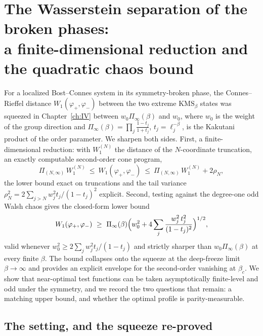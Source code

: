 \chapter[The Wasserstein separation of the broken phases]{The Wasserstein separation of the broken phases:\\ a finite-dimensional reduction and the quadratic chaos bound}\label{ch:XXIX}
\renewcommand{\Prob}{\mathrm{Prob}}
\begin{summary}
For a localized Bost--Connes system in its symmetry-broken phase, the Connes--Rieffel
distance $W_1(\varphi_+,\varphi_-)$ between the two extreme $\mathrm{KMS}_\beta$ states was
squeezed in Chapter~\ref{ch:IV} between $w_0\Pi_\infty(\beta)$ and $w_0$, where $w_0$ is
the weight of the group direction and $\Pi_\infty(\beta)=\prod_j\frac{1-t_j}{1+t_j}$,
$t_j=\ell_j^{-\beta}$, is the Kakutani product of the order parameter. We sharpen both
sides. First, a finite-dimensional reduction: with $W_1^{(N)}$ the distance of the
$N$-coordinate truncation, an exactly computable second-order cone program,
\[
\Pi_{(N,\infty)}\,W_1^{(N)}\ \le\ W_1(\varphi_+,\varphi_-)\ \le\
\Pi_{(N,\infty)}\,W_1^{(N)}+2\rho_N,
\]
the lower bound exact on truncations and the tail variance
$\rho_N^2=2\sum_{j>N}w_j^2t_j/(1-t_j)^2$ explicit. Second,
testing against the degree-one odd Walsh chaos gives the closed-form lower bound
\[
W_1(\varphi_+,\varphi_-)\ \ge\
\Pi_\infty(\beta)\Bigl(w_0^2+4\sum_{j}\frac{w_j^2\,t_j^2}{(1-t_j)^2}\Bigr)^{1/2},
\]
valid whenever $w_0^2\ge2\sum_jw_j^2t_j/(1-t_j)$ and strictly sharper than
$w_0\Pi_\infty(\beta)$ at every finite $\beta$. The bound collapses onto the squeeze at the
deep-freeze limit $\beta\to\infty$ and provides an explicit envelope for the second-order
vanishing at $\beta_c$. We show that near-optimal test functions can be taken asymptotically
finite-level and odd under the symmetry, and we record the two questions that remain: a
matching upper bound, and whether the optimal profile is parity-measurable.
\end{summary}


\section{The setting, and the squeeze re-proved}\label{XXIX:sec:setting}

